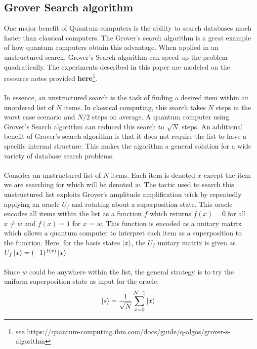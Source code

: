 \documentclass[12pt]{article}
\begin{document}
    \subsection{Grover Search algorithm}
    One major benefit of Quantum computers is the ability to search databases much faster than classical computers. The Grover's search algorithm is a great example of how quantum computers obtain this advantage. When applied in an unstructured search, Grover's Search algorithm can speed up the problem quadratically. The experiments described in this paper are modeled on the resource notes provided \textbf{here}\footnote{see https://quantum-computing.ibm.com/docs/guide/q-algos/grover-s-algorithm}. 
    \\
    \smallskip
    \\
    In essence, an unstructured search is the task of finding a desired item within an unordered list of $N$ items. In classical computing, this search takes $N$ steps in the worst case scenario and $N/2$ steps on average. A quantum computer using Grover's Search algorithm can reduced this search to $\sqrt{N}$ steps. An additional benefit of Grover's search algorithm is that it does not require the list to have a specific internal structure. This makes the algorithm a general solution for a wide variety of database search problems.
    \\
    \smallskip
    \\
    Consider an unstructured list of $N$ items. Each item is denoted $x$ except the item we are searching for which will be denoted $w$. The tactic used to search this unstructured list exploits Grover’s amplitude amplification trick by repeatedly applying an oracle $U_f$ and rotating about a superposition state. This oracle encodes all items within the list as a function $f$ which returns $f(x) = 0$ for all $x \neq w$ and $f(x) = 1$ for $x$ = $w$. This function is encoded as a unitary matrix which allows a quantum computer to interpret each item as a superposition to the function. Here, for the basis states $\ket{x}$, the $U_f$ unitary matrix is given as $U_f \ket{x} = (-1)^{f(x)} \ket{x}$.
    \\
    \smallskip
    \\
    Since $w$ could be anywhere within the list, the general strategy is to try the uniform superposition state as input for the oracle: $$\ket{s} = \frac{1}{\sqrt{N}}\sum^{N-1}_{x=0}\ket{x}$$
\end{document}
